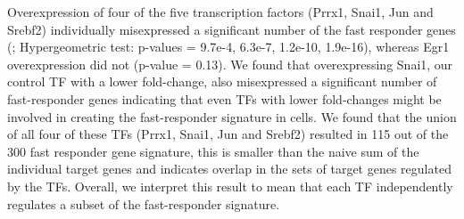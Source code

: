 Overexpression of four of the five transcription factors (Prrx1, Snai1, Jun and Srebf2) individually misexpressed a significant number of the fast responder genes (; Hypergeometric test: p-values = 9.7e-4, 6.3e-7, 1.2e-10, 1.9e-16), whereas Egr1 overexpression did not (p-value = 0.13). We found that overexpressing Snai1, our control TF with a lower fold-change, also misexpressed a significant number of fast-responder genes indicating that even TFs with lower fold-changes might be involved in creating the fast-responder signature in cells. We found that the union of all four of these TFs (Prrx1, Snai1, Jun and Srebf2) resulted in 115 out of the 300 fast responder gene signature, this is smaller than the naive sum of the individual target genes and indicates overlap in the sets of target genes regulated by the TFs. Overall, we interpret this result to mean that each TF independently regulates a subset of the fast-responder signature.

